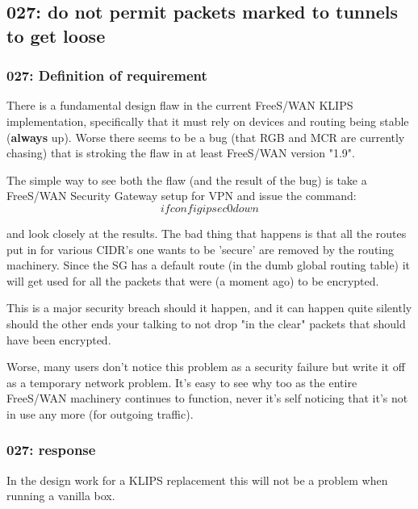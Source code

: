 \subsection{027: do not permit packets marked to tunnels to get loose}

\subsubsection{027: Definition of requirement }

There is a fundamental design flaw in the current FreeS/WAN KLIPS
implementation, specifically that it must rely on devices and routing
being stable ({\bf always} up).  Worse there seems to be a bug (that RGB and
MCR are currently chasing) that is stroking the flaw in at least FreeS/WAN
version "1.9".

The simple way to see both the flaw (and the result of the bug) is
take a FreeS/WAN Security Gateway setup for VPN and issue the command:
$$
	ifconfig ipsec0 down
$$

and look closely at the results.  The bad thing that happens is that
all the routes put in for various CIDR's one wants to be 'secure' are
removed by the routing machinery.  Since the SG has a default route
(in the dumb global routing table) it will get used for all the
packets that were (a moment ago) to be encrypted.

This is a major security breach should it happen, and it can happen
quite silently should the other ends your talking to not drop "in the
clear" packets that should have been encrypted.

Worse, many users don't notice this problem as a security failure
but write it off as a temporary network problem.  It's easy to see why
too as the entire FreeS/WAN machinery continues to function, never
it's self noticing that it's not in use any more (for outgoing
traffic).

\subsubsection{027: response}

In the design work for a KLIPS replacement this will not be a
problem when running a vanilla box.



